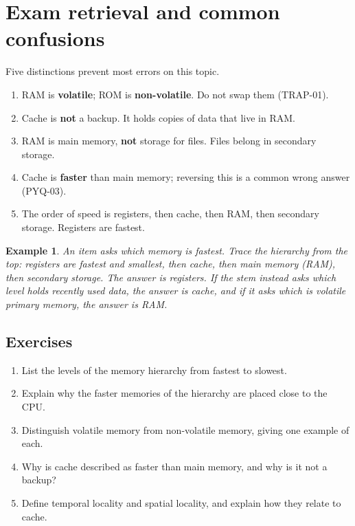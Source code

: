 \documentclass[11pt]{article}
\newtheorem{example}{Example}[section]
\begin{document}
\section{Exam retrieval and common confusions}
Five distinctions prevent most errors on this topic.
\begin{enumerate}
  \item RAM is \textbf{volatile}; ROM is \textbf{non-volatile}. Do not swap
    them (TRAP-01).
  \item Cache is \textbf{not} a backup. It holds copies of data that live in
    RAM.
  \item RAM is main memory, \textbf{not} storage for files. Files belong in
    secondary storage.
  \item Cache is \textbf{faster} than main memory; reversing this is a common
    wrong answer (PYQ-03).
  \item The order of speed is registers, then cache, then RAM, then
    secondary storage. Registers are fastest.
\end{enumerate}

\begin{example}
An item asks which memory is fastest. Trace the hierarchy from the top:
registers are fastest and smallest, then cache, then main memory (RAM), then
secondary storage. The answer is registers. If the stem instead asks which
level holds recently used data, the answer is cache, and if it asks which is
volatile primary memory, the answer is RAM.
\end{example}

\subsection*{Exercises}
\begin{enumerate}[label=\arabic*.]
  \item List the levels of the memory hierarchy from fastest to slowest.
  \item Explain why the faster memories of the hierarchy are placed close to
    the CPU.
  \item Distinguish volatile memory from non-volatile memory, giving one
    example of each.
  \item Why is cache described as faster than main memory, and why is it not
    a backup?
  \item Define temporal locality and spatial locality, and explain how they
    relate to cache.
\end{enumerate}
\end{document}

